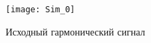 \documentclass[10pt,a4paper]{article}
\begin{document}
                                                                                                                                                                                                                                                                                                                                                                                                                                                                                                                                                                                                                                                                                                                                                                                       \begin{figure}[h]\centering
	\texttt{[image: Sim\_0]} 
	\caption{Исходный гармонический сигнал}\label{fig.l6_Sim0} 
\end{figure}
\end{document}
